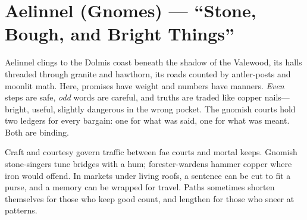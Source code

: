 \section{Aelinnel (Gnomes) --- ``Stone, Bough, and Bright Things''}
\label{chap:aelinnel}

\begin{tcolorbox}[colback=black!3,colframe=black!40!white,title={Stone, Bough, and Bright Things}]
Aelinnel clings to the Dolmis coast beneath the shadow of the Valewood, its halls threaded through granite and hawthorn, its roads counted by antler-posts and moonlit math. Here, promises have weight and numbers have manners. \emph{Even} steps are safe, \emph{odd} words are careful, and truths are traded like copper nails---bright, useful, slightly dangerous in the wrong pocket. The gnomish courts hold two ledgers for every bargain: one for what was said, one for what was meant. Both are binding.

Craft and courtesy govern traffic between fae courts and mortal keeps. Gnomish stone-singers tune bridges with a hum; forester-wardens hammer copper where iron would offend. In markets under living roofs, a sentence can be cut to fit a purse, and a memory can be wrapped for travel. Paths sometimes shorten themselves for those who keep good count, and lengthen for those who sneer at patterns.
\end{tcolorbox}

